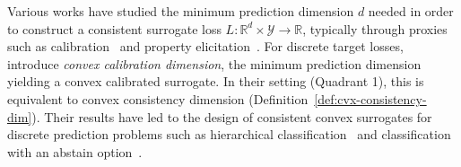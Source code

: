 \documentclass[anon,12pt]{colt2021} %
\newcommand{\Comments}{1}
\newcommand{\mytodo}[2]{\ifnum\Comments=1%
	\todo[linecolor=#1!80!black,backgroundcolor=#1,bordercolor=#1!80!black]{#2}\fi}
\newcommand{\raft}[1]{\mytodo{green!20!white}{RF: #1}}
\newcommand{\jessiet}[1]{\mytodo{purple!20!white}{JF: #1}}
\newcommand{\btw}[1]{\mytodo{orange!80!white}{BTW: #1}}
\newcommand{\reals}{\mathbb{R}}
\newcommand{\ccdim}{\mathrm{cc\,dim}}
\newcommand{\Lcvx}{\mathcal{L}^{\text{cvx}}}
\newcommand{\Y}{\mathcal{Y}}
\begin{document}
Various works have studied the minimum prediction dimension $d$ needed in order to construct a consistent surrogate loss $L: \reals^d \times \Y \to \reals$, typically through proxies such as calibration~\citep{steinwart2008support,agarwal2015consistent,ramaswamy2016convex} and property elicitation~\citep{frongillo2015vector-valued,fissler2016higher,frongillo2020elicitation}.
For discrete target losses, \citet{ramaswamy2016convex} introduce \emph{convex calibration dimension}, the minimum prediction dimension yielding a convex calibrated surrogate.
In their setting (Quadrant 1), this is equivalent to convex consistency dimension (Definition~\ref{def:cvx-consistency-dim}).
Their results have led to the design of consistent convex surrogates for discrete prediction problems such as hierarchical classification~\citep{ramaswamy2015hierarchical} and classification with an abstain option~\citep{ramaswamy2018consistent}.


\end{document}
